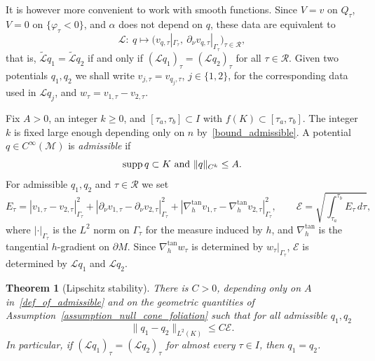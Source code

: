 \documentclass[12pt,reqno]{amsart}
\numberwithin{equation}{section}
\theoremstyle{definition}
\theoremstyle{plain}
\newtheorem{theorem}{Theorem}[section]
\theoremstyle{definition}
\theoremstyle{definition}
\newcommand{\M}{\mathcal{M}}
\newcommand{\uu}{M}
\DeclareMathOperator{\supp}{supp}
\begin{document}
It is however more convenient to work with smooth functions. Since $V=v$ on $Q_\tau$, $V=0$ on $\{\varphi_\tau<0\}$, and $\alpha$ does not depend on $q$, these data are equivalent to
\begin{equation}\label{eq_data_v}
\mathcal L:\ q\longmapsto\bigl(v_{q,\tau}|_{\Gamma_\tau},\ \partial_\nu v_{q,\tau}|_{\Gamma_\tau}\bigr)_{\tau\in\mathcal R},
\end{equation}
that is, $\tilde{\mathcal L}q_1=\tilde{\mathcal L}q_2$ if and only if $(\mathcal Lq_1)_\tau=(\mathcal Lq_2)_\tau$ for all $\tau\in\mathcal R$. Given two potentials $q_1,q_2$ we shall write $v_{j,\tau}=v_{q_j,\tau}$, $j \in \{1,2\}$, for the corresponding data used in $\mathcal{L}q_j$, and $w_\tau=v_{1,\tau}-v_{2,\tau}$.

Fix $A>0$, an integer $k\ge0$, and $[\tau_a,\tau_b]\subset I$ with $f(K)\subset[\tau_a,\tau_b]$. The integer $k$ is fixed large enough depending only on $n$ by~\eqref{bound_admissible}. A potential $q\in C^\infty(\M)$ is \textit{admissible} if
\begin{equation}
\label{def_of_admissible}
\supp q\subset K \textnormal{ and } \|q\|_{C^k}\le A.
\end{equation}
For admissible $q_1,q_2$ and $\tau\in\mathcal R$ we set
\begin{equation}\label{eq_data_E}
 E_\tau=|v_{1,\tau}-v_{2,\tau}|^2_{\Gamma_\tau}+|\partial_\nu v_{1,\tau}-\partial_\nu v_{2,\tau}|^2_{\Gamma_\tau}+|\nabla_h^{\tan} v_{1,\tau}-\nabla_h^{\tan}v_{2,\tau}|^2_{\Gamma_\tau},\qquad \mathcal E= \sqrt{\int_{\tau_a}^{\tau_b} E_\tau\,d\tau },
\end{equation}
where $|\cdot|_{\Gamma_\tau}$ is the $L^2$ norm on $\Gamma_\tau$ for the measure induced by $h$, and $\nabla_h^{\tan}$ is the tangential $h$-gradient on $\partial\uu$. Since $\nabla_h^{\tan}w_\tau$ is determined by $w_\tau|_{\Gamma_\tau}$, $\mathcal E$ is determined by $\mathcal Lq_1$ and $\mathcal Lq_2$.

\begin{theorem}[Lipschitz stability]\label{thm_main}
There is $C>0$, depending only on $A$ in~\eqref{def_of_admissible} and on the geometric quantities of Assumption~\ref{assumption_null_cone_foliation} such that for all admissible $q_1,q_2$
\[
\|q_1-q_2\|_{L^2(K)}\le C\mathcal E.
\]
In particular, if $(\mathcal Lq_1)_\tau=(\mathcal Lq_2)_\tau$ for almost every $\tau\in I$, then $q_1=q_2$.
\end{theorem}
\end{document}
